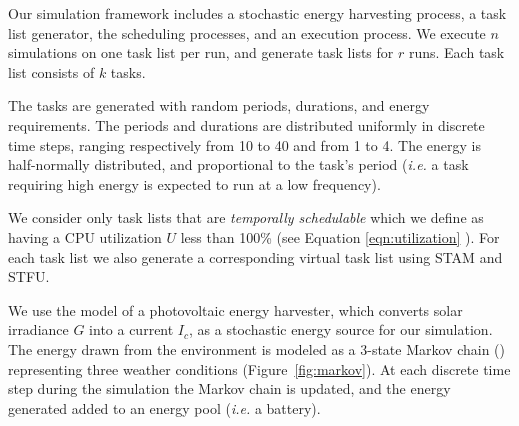 Our simulation framework includes a stochastic energy harvesting process, a task list generator, the scheduling processes, and an execution process.  
We execute $n$ simulations on one task list per run, and generate task lists for $r$ runs.  Each task list consists of $k$ tasks.


The tasks are generated with random periods, durations, and energy requirements.  The periods and durations are distributed uniformly in discrete time steps, 
ranging respectively from 10 to 40 and from 1 to 4.  
The energy is half-normally distributed, and proportional to the task's period (\emph{i.e.} a task requiring high energy is expected to run at a low frequency).

We consider only task lists that are \emph{temporally schedulable} which we define as having a 
CPU utilization $U$ less than 100\% (see Equation \ref{eqn:utilization} ). 
For each task list we also generate a corresponding virtual task list using \textsc{STAM} and \textsc{STFU}. 


We use the model of a photovoltaic energy harvester, which converts solar irradiance $G$ into a current $I_c$, as a stochastic energy source for our simulation.  The energy drawn from the environment is modeled as a 3-state Markov chain (\cite{poggi2000stochastic,moser2007real}) representing three weather conditions (Figure~\ref{fig:markov}).  At each discrete time step during the simulation the Markov chain is updated, and the energy generated added to an energy pool (\emph{i.e.} a battery).

